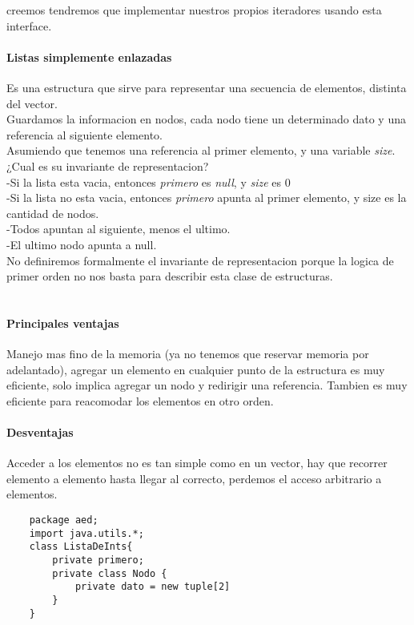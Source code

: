 \documentclass[10pt, a4paper]{article}
\begin{document}
creemos tendremos que implementar nuestros propios iteradores usando esta interface.
\\\paragraph*{Listas simplemente enlazadas}Es una estructura que sirve para representar una secuencia de elementos,
 distinta del vector.
\\ Guardamos la informacion en nodos, cada nodo tiene un determinado dato y una referencia al siguiente elemento.
\\Asumiendo que tenemos una referencia al primer elemento, y una variable \emph{size}. ¿Cual es su invariante de representacion?
\\-Si la lista esta vacia, entonces \emph{primero} es \emph{null}, y \emph{size} es 0
\\-Si la lista no esta vacia, entonces \emph{primero} apunta al primer elemento, y size es la cantidad de nodos.
\\-Todos apuntan al siguiente, menos el ultimo.
\\-El ultimo nodo apunta a null.
\\No definiremos formalmente el invariante de representacion porque la logica de primer orden no nos basta para describir
esta clase de estructuras.
\\
\\\paragraph*{Principales ventajas} Manejo mas fino de la memoria (ya no tenemos que reservar memoria por adelantado),
agregar un elemento en cualquier punto de la estructura es muy eficiente, solo implica agregar un nodo y redirigir una referencia.
Tambien es muy eficiente para reacomodar los elementos en otro orden.
\\\paragraph*{Desventajas} Acceder a los elementos no es tan simple como en un vector, hay que recorrer elemento a elemento hasta llegar
al correcto, perdemos el acceso arbitrario a elementos.
\begin{lstlisting}
    package aed;
    import java.utils.*;
    class ListaDeInts{
        private primero;
        private class Nodo {
            private dato = new tuple[2]
        }
    }
\end{lstlisting}
\end{document}
